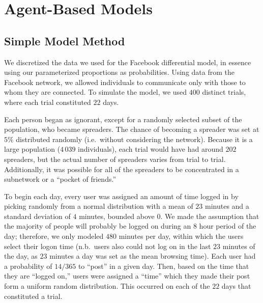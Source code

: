 \section{Agent-Based Models }
\label{sec:abmodel}

\subsection{Simple Model Method}
\label{subsec:abmodelsetup}

\noindent We discretized the data we used for the Facebook differential model, in essence using our parameterized proportions as probabilities.
Using data from the Facebook network, we allowed individuals to communicate only with those to whom they are connected.
To simulate the model, we used $ 400 $ distinct trials, where each trial constituted $ 22 $ days.

Each person began as ignorant, except for a randomly selected subset of the population, who became spreaders.
The chance of becoming a spreader was set at $ 5\% $ distributed randomly (i.e.\ without considering the network).
Because it is a large population ($ 4\,039 $ individuals), each trial would have had around $ 202 $ spreaders, but the actual number of spreaders varies from trial to trial.
Additionally,  it was possible for all of the spreaders to be concentrated in a subnetwork or a ``pocket of friends.''

To begin each day, every user was assigned an amount of time logged in by picking randomly from a normal distribution with a mean of $ 23 $ minutes and a standard deviation of $ 4 $ minutes, bounded above $ 0 $.
We made the assumption that the majority of people will probably be logged on during an $8$ hour period of the day; therefore, we only modeled $480$ minutes per day, within which the users select their logon time (n.b.\ users also could not log on in the last $ 23 $ minutes of the day, as $ 23 $ minutes a day was set as the mean browsing time).
Each user had a probability of $14/365$ to ``post'' in a given day.
Then, based on the time that they are ``logged on,'' users were assigned a ``time'' which they made their post form a uniform random distribution.
This occurred on each of the $ 22 $ days that constituted a trial.


